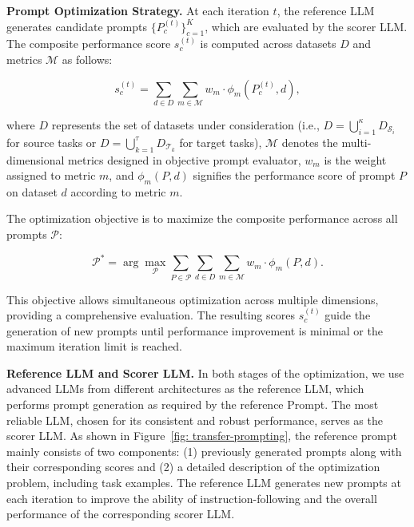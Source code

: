 \textbf{Prompt Optimization Strategy.}
At each iteration \( t \), the reference LLM generates candidate prompts \( \{ P^{(t)}_c \}_{c=1}^K \), which are evaluated by the scorer LLM. The composite performance score \( s^{(t)}_c \) is computed across datasets \( D \) and metrics \( \mathcal{M} \) as follows:

\begin{equation}
s^{(t)}_c = \sum_{d \in D} \sum_{m \in \mathcal{M}} w_m \cdot \phi_m(P^{(t)}_c, d),
\label{eq:objective_evaluator_multi_metric}
\end{equation}

where \( D \) represents the set of datasets under consideration (i.e., \( D = \bigcup_{i=1}^\kappa D_{\mathcal{S}_i} \) for source tasks or \( D = \bigcup_{k=1}^\tau D_{\mathcal{T}_k} \) for target tasks), \( \mathcal{M} \) denotes the multi-dimensional metrics designed in objective prompt evaluator, \( w_m \) is the weight assigned to metric \( m \), and \( \phi_m(P, d) \) signifies the performance score of prompt \( P \) on dataset \( d \) according to metric \( m \).

The optimization objective is to maximize the composite performance across all prompts \( \mathcal{P} \):

\begin{equation}
\mathcal{P}^{*} = \arg\max_{\mathcal{P}} \sum_{P \in \mathcal{P}} \sum_{d \in D} \sum_{m \in \mathcal{M}} w_m \cdot \phi_m(P, d).
\label{eq:optimization_objective_multi_metric}
\end{equation}

This objective allows simultaneous optimization across multiple dimensions, providing a comprehensive evaluation. The resulting scores \( s^{(t)}_c \) guide the generation of new prompts until performance improvement is minimal or the maximum iteration limit is reached.

\textbf{Reference LLM and Scorer LLM.} In both stages of the optimization, we use advanced LLMs from different architectures as the reference LLM, which performs prompt generation as required by the reference Prompt. The most reliable LLM, chosen for its consistent and robust performance, serves as the scorer LLM. As shown in Figure~\ref{fig: transfer-prompting}, the reference prompt mainly consists of two components: (1) previously generated prompts along with their corresponding scores and (2) a detailed description of the optimization problem, including task examples. The reference LLM generates new prompts at each iteration to improve the ability of instruction-following and the overall performance of the corresponding scorer LLM.

